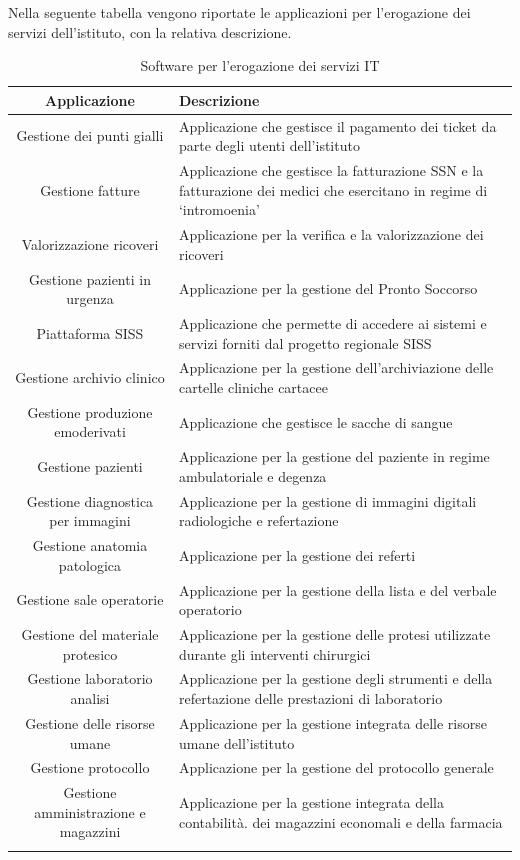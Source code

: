 \documentclass[12pt, a4paper, titlepage]{report}
\begin{document}
	Nella seguente tabella vengono riportate le applicazioni per l'erogazione dei servizi dell'istituto, con la relativa descrizione.
	\begin{longtable}{| c | p{10cm} |}
		\hline
		\textbf{Applicazione} & \textbf{Descrizione}\\ \hline
		Gestione dei punti gialli & Applicazione che gestisce il pagamento dei ticket da parte degli utenti dell'istituto\\ \hline
		Gestione fatture & Applicazione che gestisce la fatturazione SSN e la fatturazione dei medici che esercitano in regime di `intromoenia' \\ \hline
		Valorizzazione ricoveri & Applicazione per la verifica e la valorizzazione dei ricoveri \\ \hline
		Gestione pazienti in urgenza & Applicazione per la gestione del Pronto Soccorso \\ \hline
		Piattaforma SISS & Applicazione che permette di accedere ai sistemi e servizi forniti dal progetto regionale SISS \\ \hline
		Gestione archivio clinico & Applicazione per la gestione dell'archiviazione delle cartelle cliniche cartacee \\ \hline
		Gestione produzione emoderivati & Applicazione che gestisce le sacche di sangue \\ \hline
		Gestione pazienti & Applicazione per la gestione del paziente in regime ambulatoriale e degenza \\ \hline
		Gestione diagnostica per immagini & Applicazione per la gestione di immagini digitali radiologiche e refertazione \\ \hline
		Gestione anatomia patologica & Applicazione per la gestione dei referti \\ \hline
		Gestione sale operatorie & Applicazione per la gestione della lista e del verbale operatorio \\ \hline
		Gestione del materiale protesico & Applicazione per la gestione delle protesi utilizzate durante gli interventi chirurgici \\ \hline
		Gestione laboratorio analisi & Applicazione per la gestione degli strumenti e della refertazione delle prestazioni di laboratorio \\ \hline
		Gestione delle risorse umane & Applicazione per la gestione integrata delle risorse umane dell'istituto \\ \hline
		Gestione protocollo & Applicazione per la gestione del protocollo generale \\ \hline
		Gestione amministrazione e magazzini & Applicazione per la gestione integrata della contabilità. dei magazzini economali e della farmacia \\ \hline
		\caption{Software per l'erogazione dei servizi IT}
	\end{longtable}
	
\end{document}
